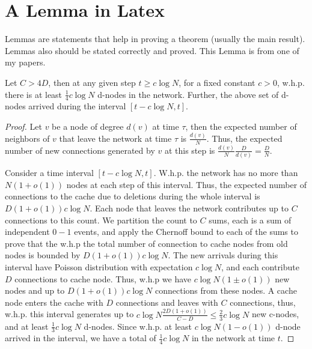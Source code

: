 \section{A Lemma in Latex}

Lemmas are statements that help in proving a theorem (usually the main result).
Lemmas also should be stated correctly and proved. This Lemma is from one of my papers.

\begin{lemma}
\label{lem:capacity} Let $C> 4D$, then at any given step $t \geq c\log N$, for a fixed
constant $c >0$, w.h.p. there is at least $\frac{1}{4}c\log N$ d-nodes in the network.
Further, the above set of d-nodes arrived during the interval $[t-c\log N, t]$.
\end{lemma}

\begin{proof}
Let $v$ be a node of degree $d(v)$ at time $\tau$, then the expected number of
neighbors of $v$ that leave the network at time $\tau$ is $\frac{d(v)}{N}$. Thus, the
expected number of new connections generated by $v$ at this step is $\frac{d(v)}{
N}\frac{D}{d(v)}=\frac{D}{N}$.

Consider a time interval $[t- c\log N,t]$. W.h.p. the network has no more than
$N(1+o(1))$ nodes at each step of this interval. Thus, the expected number of
connections to the cache due to deletions during the whole interval is $D(1+o(1))c\log
N$. Each node that leaves the network contributes up to $C$ connections to this count.
We partition the count to $C$ sums,  each is a sum of independent $0-1$ events, and
apply the Chernoff bound to each of the sums to prove that the w.h.p the total number
of connection to cache nodes from old nodes is bounded by $D(1+o(1))c \log N$. The new
arrivals during this interval have Poisson distribution with expectation $c\log N$, and
each contribute $D$ connections to cache node. Thus, w.h.p we have $c\log N(1\pm o(1))$
new nodes and up to $D(1+o(1))c\log N$ connections from these nodes. A cache node
enters the cache with $D$ connections and leaves with $C$ connections, thus, w.h.p.
this interval generates up to $c\log N\frac{2D(1+o(1))}{C-D}\leq \frac{2}{3} c\log N$ new c-nodes,
and at least $\frac{1}{3}c \log N$ d-nodes.
Since w.h.p. at least $c\log N(1-o(1))$ d-node arrived in the interval, we have a total
of $\frac{1}{4}c\log N$ in the network at time $t$.
\end{proof}